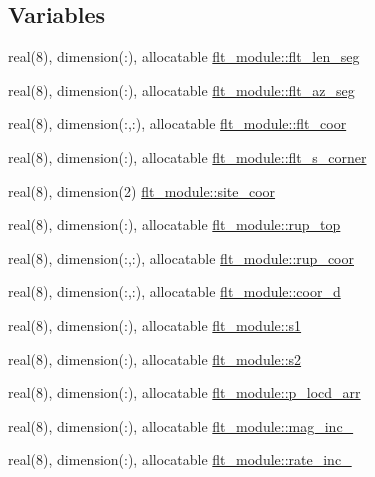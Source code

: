 \subsection*{Variables}
\begin{DoxyCompactItemize}
\item 
real(8), dimension(\+:), allocatable \hyperlink{namespaceflt__module_aca5726712ea516198b181e7cb2f58a79}{flt\+\_\+module\+::flt\+\_\+len\+\_\+seg}
\item 
real(8), dimension(\+:), allocatable \hyperlink{namespaceflt__module_afe7ee1528f7162ad84a3517be2962885}{flt\+\_\+module\+::flt\+\_\+az\+\_\+seg}
\item 
real(8), dimension(\+:,\+:), allocatable \hyperlink{namespaceflt__module_a5f040c388185e1ef250084d5c59d41e9}{flt\+\_\+module\+::flt\+\_\+coor}
\item 
real(8), dimension(\+:), allocatable \hyperlink{namespaceflt__module_ade0f97d7261ffc38567aa16de68c1583}{flt\+\_\+module\+::flt\+\_\+s\+\_\+corner}
\item 
real(8), dimension(2) \hyperlink{namespaceflt__module_a2aeddbabcca2c320d94712a5ef502b79}{flt\+\_\+module\+::site\+\_\+coor}
\item 
real(8), dimension(\+:), allocatable \hyperlink{namespaceflt__module_ab5c2fb389cfd0080d938d50ef55e28ef}{flt\+\_\+module\+::rup\+\_\+top}
\item 
real(8), dimension(\+:,\+:), allocatable \hyperlink{namespaceflt__module_afbf76baeddad45d761cc805c838b369a}{flt\+\_\+module\+::rup\+\_\+coor}
\item 
real(8), dimension(\+:,\+:), allocatable \hyperlink{namespaceflt__module_a46387202eab4affb664fabc1dfbc3523}{flt\+\_\+module\+::coor\+\_\+d}
\item 
real(8), dimension(\+:), allocatable \hyperlink{namespaceflt__module_a388db17b48dfcaeb0b4c53d1a23f83b6}{flt\+\_\+module\+::s1}
\item 
real(8), dimension(\+:), allocatable \hyperlink{namespaceflt__module_a774958e9c5ad266c9faed76a724e27ac}{flt\+\_\+module\+::s2}
\item 
real(8), dimension(\+:), allocatable \hyperlink{namespaceflt__module_a3ae9412ace7bafcdc16443a1de523c08}{flt\+\_\+module\+::p\+\_\+locd\+\_\+arr}
\item 
real(8), dimension(\+:), allocatable \hyperlink{namespaceflt__module_a758f2d6ebaadfe7af02eddd7ab5e4bdd}{flt\+\_\+module\+::mag\+\_\+inc\+\_}
\item 
real(8), dimension(\+:), allocatable \hyperlink{namespaceflt__module_a3aa16b477093fff931adc3d47efb4391}{flt\+\_\+module\+::rate\+\_\+inc\+\_}

\end{DoxyCompactItemize}
